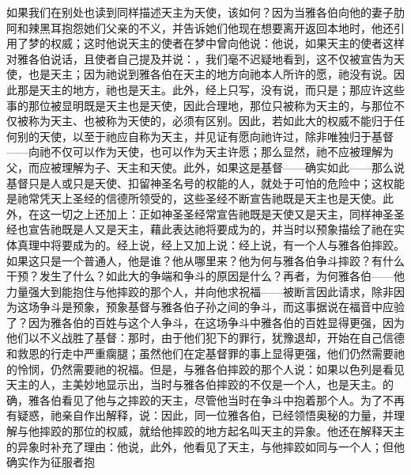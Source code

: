 如果我们在别处也读到同样描述天主为天使，该如何？因为当雅各伯向他的妻子肋阿和辣黑耳抱怨她们父亲的不义，并告诉她们他现在想要离开返回本地时，他还引用了梦的权威；这时他说天主的使者在梦中曾向他说：他说，如果天主的使者这样对雅各伯说话，且使者自己提及并说：，我们毫不迟疑地看到，这不仅被宣告为天使，也是天主；因为祂说到雅各伯在天主的地方向祂本人所许的愿，祂没有说。因此那是天主的地方，祂也是天主。此外，经上只写，没有说，而只是；那应许这些事的那位被显明既是天主也是天使，因此合理地，那位只被称为天主的，与那位不仅被称为天主、也被称为天使的，必须有区别。因此，若如此大的权威不能归于任何别的天使，以至于祂应自称为天主，并见证有愿向祂许过，除非唯独归于基督——向祂不仅可以作为天使，也可以作为天主许愿；那么显然，祂不应被理解为父，而应被理解为子、天主和天使。此外，如果这是基督——确实如此——那么说基督只是人或只是天使、扣留神圣名号的权能的人，就处于可怕的危险中；这权能是祂常凭天上圣经的信德所领受的，这些圣经不断宣告祂既是天主也是天使。此外，在这一切之上还加上：正如神圣圣经常宣告祂既是天使又是天主，同样神圣圣经也宣告祂既是人又是天主，藉此表达祂将要成为的，并当时以预象描绘了祂在实体真理中将要成为的。经上说，经上又加上说：经上说，有一个人与雅各伯摔跤。如果这只是一个普通人，他是谁？他从哪里来？他为何与雅各伯争斗摔跤？有什么干预？发生了什么？如此大的争端和争斗的原因是什么？再者，为何雅各伯——他力量强大到能抱住与他摔跤的那个人，并向他求祝福——被断言因此请求，除非因为这场争斗是预象，预象基督与雅各伯子孙之间的争斗，而这事据说在福音中应验了？因为雅各伯的百姓与这个人争斗，在这场争斗中雅各伯的百姓显得更强，因为他们以不义战胜了基督：那时，由于他们犯下的罪行，犹豫退却，开始在自己信德和救恩的行走中严重瘸腿；虽然他们在定基督罪的事上显得更强，他们仍然需要祂的怜悯，仍然需要祂的祝福。但是，与雅各伯摔跤的那个人说：如果以色列是看见天主的人，主美妙地显示出，当时与雅各伯摔跤的不仅是一个人，也是天主。的确，雅各伯看见了他与之摔跤的天主，尽管他当时在争斗中抱着那个人。为了不再有疑惑，祂亲自作出解释，说：因此，同一位雅各伯，已经领悟奥秘的力量，并理解与他摔跤的那位的权威，就给他摔跤的地方起名叫天主的异象。他还在解释天主的异象时补充了理由：他说，此外，他看见了天主，与他摔跤如同与一个人；但他确实作为征服者抱